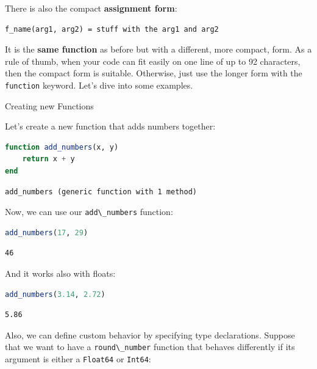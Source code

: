 \documentclass[
  notoc %
]{tufte-book}
\makeatletter
\newcommand{\passthrough}[1]{#1}
\renewcommand\subsubsection{%
\@startsection{subsubsection}{3}{\z@ }{-3.25ex\@plus -1ex \@minus -.2ex}{1.5ex \@plus .2ex}{\normalfont \normalsize \bfseries }
}
\makeatother
\begin{document}
There is also the compact \textbf{assignment form}:

\begin{lstlisting}
f_name(arg1, arg2) = stuff with the arg1 and arg2
\end{lstlisting}

It is the \textbf{same function} as before but with a different, more
compact, form. As a rule of thumb, when your code can fit easily on one
line of up to 92 characters, then the compact form is suitable.
Otherwise, just use the longer form with the
\passthrough{\lstinline!function!} keyword. Let's dive into some
examples.

\hypertarget{sec:function_example}{%
\subsubsection{Creating new Functions}\label{sec:function_example}}

Let's create a new function that adds numbers together:

\begin{lstlisting}[language=Julia]
function add_numbers(x, y)
    return x + y
end
\end{lstlisting}

\begin{lstlisting}[language=Output]
add_numbers (generic function with 1 method)
\end{lstlisting}

Now, we can use our \passthrough{\lstinline!add\_numbers!} function:

\begin{lstlisting}[language=Julia]
add_numbers(17, 29)
\end{lstlisting}

\begin{lstlisting}[language=Output]
46
\end{lstlisting}

And it works also with floats:

\begin{lstlisting}[language=Julia]
add_numbers(3.14, 2.72)
\end{lstlisting}

\begin{lstlisting}[language=Output]
5.86
\end{lstlisting}

Also, we can define custom behavior by specifying type declarations.
Suppose that we want to have a \passthrough{\lstinline!round\_number!}
function that behaves differently if its argument is either a
\passthrough{\lstinline!Float64!} or \passthrough{\lstinline!Int64!}:
\end{document}
